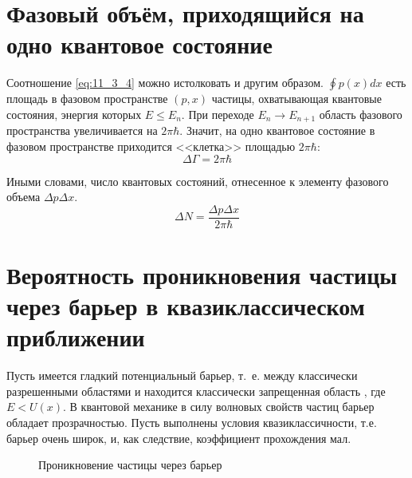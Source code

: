\section{Фазовый объём, приходящийся на одно квантовое состояние}

Соотношение \eqref{eq:11_3_4} можно истолковать и другим образом. $\oint p(x)dx$ есть площадь в фазовом пространстве $(p,x)$ частицы, охватывающая квантовые состояния, энергия которых $E \le E_n$. При переходе $E_n \to E_{n+1}$ область фазового пространства увеличивается на $2\pi\hbar$. Значит, на одно квантовое состояние в фазовом пространстве приходится <<клетка>> площадью $2\pi \hbar$:
$$
\boxed{\Delta\Gamma = 2\pi\hbar}
$$

Иными словами, число квантовых состояний, отнесенное к элементу фазового объема $\Delta p \Delta x$.
$$
\boxed{\Delta N = \frac{\Delta p \Delta x}{2\pi\hbar}}
$$

\begin{sloppypar}
  \section{Вероятность проникновения частицы через барьер в квазиклассическом приближении}
\end{sloppypar}

Пусть имеется гладкий потенциальный барьер, т.~е. между классически разрешенными областями  и  находится классически запрещенная область , где $E < U(x)$. В квантовой механике в силу волновых свойств частиц барьер обладает прозрачностью. Пусть выполнены условия квазиклассичности, т.е. барьер очень широк, и, как следствие, коэффициент прохождения мал. 

\begin{figure}[h]
\centering
{}
\caption{Проникновение частицы через барьер} \label{fig:11_5}
\end{figure}

